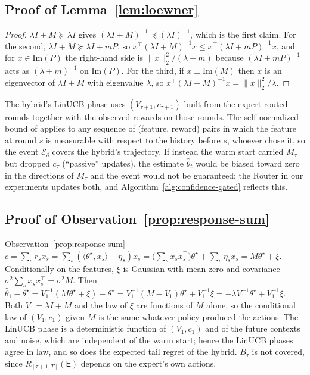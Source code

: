 \documentclass[anon]{alt2027} %
\newcommand{\Exp}{\mathsf{E}}
\begin{document}
\subsection{Proof of Lemma~\ref{lem:loewner}}
\label{app:proof-loewner}

\begin{proof}
$\lambda I+M\succeq\lambda I$ gives $(\lambda I+M)^{-1}\preceq(\lambda I)^{-1}$,
which is the first claim. For the second, $\lambda I+M\succeq\lambda I+mP$, so
$x^\top(\lambda I+M)^{-1}x\le x^\top(\lambda I+mP)^{-1}x$, and for
$x\in\mathrm{Im}(P)$ the right-hand side is $\|x\|_2^2/(\lambda+m)$ because
$(\lambda I+mP)^{-1}$ acts as $(\lambda+m)^{-1}$ on $\mathrm{Im}(P)$. For the
third, if $x\perp\mathrm{Im}(M)$ then $x$ is an eigenvector of $\lambda I+M$
with eigenvalue $\lambda$, so $x^\top(\lambda I+M)^{-1}x=\|x\|_2^2/\lambda$.
\end{proof}

\begin{remark}
The hybrid's LinUCB phase uses $(V_{\tau+1},c_{\tau+1})$ built from the
expert-routed rounds together with the observed rewards on those rounds. The
self-normalized bound of \citet{abbasi2011improved} applies to any sequence of
(feature, reward) pairs in which the feature at round $s$ is measurable with
respect to the history before $s$, whoever chose it, so the event
$\mathcal E_\delta$ covers the hybrid's trajectory. If instead the warm start
carried $M_\tau$ but dropped $c_\tau$ (``passive'' updates), the estimate
$\widehat\theta_t$ would be biased toward zero in the directions of $M_\tau$
and the event would not be guaranteed; the Router in our experiments updates
both, and Algorithm~\ref{alg:confidence-gated} reflects this.
\end{remark}

\subsection{Proof of Observation~\ref{prop:response-sum}}
\label{app:proof-two-channels}

\begin{proofof}{Observation~\ref{prop:response-sum}}
$c=\sum_sr_sx_s=\sum_s(\langle\theta^\star,x_s\rangle+\eta_s)x_s
=\bigl(\sum_sx_sx_s^\top\bigr)\theta^\star+\sum_s\eta_sx_s=M\theta^\star+\xi$.
Conditionally on the features, $\xi$ is Gaussian with mean zero and covariance
$\sigma^2\sum_sx_sx_s^\top=\sigma^2M$. Then
$\widehat\theta_1-\theta^\star=V_1^{-1}(M\theta^\star+\xi)-\theta^\star
=V_1^{-1}(M-V_1)\theta^\star+V_1^{-1}\xi=-\lambda V_1^{-1}\theta^\star+V_1^{-1}\xi$.
Both $V_1=\lambda I+M$ and the law of $\xi$ are functions of $M$ alone, so the
conditional law of $(V_1,c_1)$ given $M$ is the same whatever policy produced
the actions. The LinUCB phase is a deterministic function of $(V_1,c_1)$ and of
the future contexts and noise, which are independent of the warm start; hence
the LinUCB phases agree in law, and so does the expected tail regret of the
hybrid. $B_\tau$ is not covered, since $R_{[\tau+1,T]}(\Exp)$ depends on the
expert's own actions.
\end{proofof}
\end{document}
